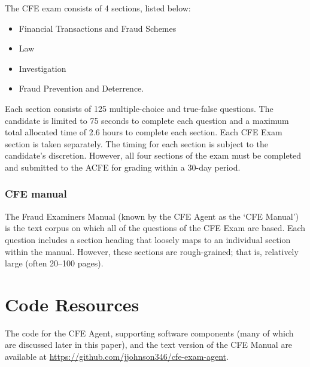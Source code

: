 The CFE exam consists of 4 sections, listed below:

\begin{itemize}
\item Financial Transactions and Fraud Schemes 
\item Law 
\item Investigation
\item Fraud Prevention and Deterrence.  
\end{itemize}

Each section consists of 125 multiple-choice and true-false questions.  The candidate is limited to 75 seconds to complete each question and a maximum total allocated time of 2.6 hours to complete each section.  Each CFE Exam section is taken separately.  The timing for each section is subject to the candidate’s discretion.  However, all four sections of the exam must be completed and submitted to the ACFE for grading within a 30-day period.

\subsubsection{CFE manual}

The Fraud Examiners Manual (known by the CFE Agent as the `CFE Manual') is the text corpus on which all of the questions of the CFE Exam are based.  Each question includes a section heading that loosely maps to an individual section within the manual.  However, these sections are rough-grained; that is, relatively large (often 20--100 pages).  

\section{Code Resources}

The code for the CFE Agent, supporting software components (many of which are discussed later in this paper), and the text version of the CFE Manual are available at \url{https://github.com/jjohnson346/cfe-exam-agent}.








